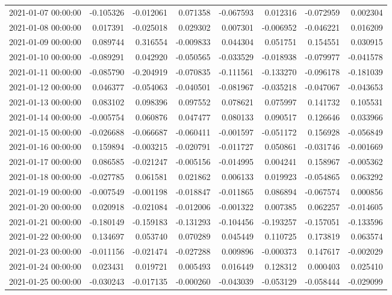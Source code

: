\begin{tabular}{lrrrrrrr}
2021-01-07 00:00:00 & -0.105326 & -0.012061 & 0.071358 & -0.067593 & 0.012316 & -0.072959 & 0.002304 \\
2021-01-08 00:00:00 & 0.017391 & -0.025018 & 0.029302 & 0.007301 & -0.006952 & -0.046221 & 0.016209 \\
2021-01-09 00:00:00 & 0.089744 & 0.316554 & -0.009833 & 0.044304 & 0.051751 & 0.154551 & 0.030915 \\
2021-01-10 00:00:00 & -0.089291 & 0.042920 & -0.050565 & -0.033529 & -0.018938 & -0.079977 & -0.041578 \\
2021-01-11 00:00:00 & -0.085790 & -0.204919 & -0.070835 & -0.111561 & -0.133270 & -0.096178 & -0.181039 \\
2021-01-12 00:00:00 & 0.046377 & -0.054063 & -0.040501 & -0.081967 & -0.035218 & -0.047067 & -0.043653 \\
2021-01-13 00:00:00 & 0.083102 & 0.098396 & 0.097552 & 0.078621 & 0.075997 & 0.141732 & 0.105531 \\
2021-01-14 00:00:00 & -0.005754 & 0.060876 & 0.047477 & 0.080133 & 0.090517 & 0.126646 & 0.033966 \\
2021-01-15 00:00:00 & -0.026688 & -0.066687 & -0.060411 & -0.001597 & -0.051172 & 0.156928 & -0.056849 \\
2021-01-16 00:00:00 & 0.159894 & -0.003215 & -0.020791 & -0.011727 & 0.050861 & -0.031746 & -0.001669 \\
2021-01-17 00:00:00 & 0.086585 & -0.021247 & -0.005156 & -0.014995 & 0.004241 & 0.158967 & -0.005362 \\
2021-01-18 00:00:00 & -0.027785 & 0.061581 & 0.021862 & 0.006133 & 0.019923 & -0.054865 & 0.063292 \\
2021-01-19 00:00:00 & -0.007549 & -0.001198 & -0.018847 & -0.011865 & 0.086894 & -0.067574 & 0.000856 \\
2021-01-20 00:00:00 & 0.020918 & -0.021084 & -0.012006 & -0.001322 & 0.007385 & 0.062257 & -0.014605 \\
2021-01-21 00:00:00 & -0.180149 & -0.159183 & -0.131293 & -0.104456 & -0.193257 & -0.157051 & -0.133596 \\
2021-01-22 00:00:00 & 0.134697 & 0.053740 & 0.070289 & 0.045449 & 0.110725 & 0.173819 & 0.063574 \\
2021-01-23 00:00:00 & -0.011156 & -0.021474 & -0.027288 & 0.009896 & -0.000373 & 0.147617 & -0.002029 \\
2021-01-24 00:00:00 & 0.023431 & 0.019721 & 0.005493 & 0.016449 & 0.128312 & 0.000403 & 0.025410 \\
2021-01-25 00:00:00 & -0.030243 & -0.017135 & -0.000260 & -0.043039 & -0.053129 & -0.058444 & -0.029099 \\

\end{tabular}
